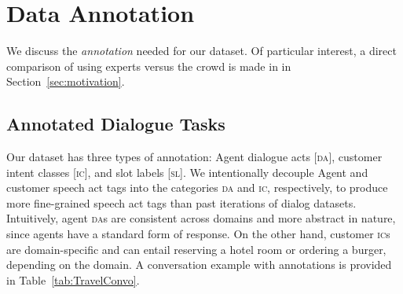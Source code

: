 
\section{Data Annotation}
We discuss the \textit{annotation} needed for our dataset.  
%
Of particular interest, a direct comparison of using experts versus the crowd is made in in Section~\ref{sec:motivation}.

\subsection{Annotated Dialogue Tasks}
Our dataset has three types of annotation: Agent dialogue acts [\textsc{da}], customer intent classes [\textsc{ic}], and slot labels [\textsc{sl}].  
%
We intentionally decouple Agent and customer speech act tags into the categories \textsc{da} and \textsc{ic}, respectively, to produce more fine-grained speech act tags than past iterations of dialog datasets. 
%
Intuitively, agent \textsc{da}s are consistent across domains and more abstract in nature, since agents have a standard form of response. 
%
On the other hand, customer \textsc{ic}s are domain-specific and can entail reserving a hotel room or ordering a burger, depending on the domain.  
%
A conversation example with annotations is provided in Table~\ref{tab:TravelConvo}.



